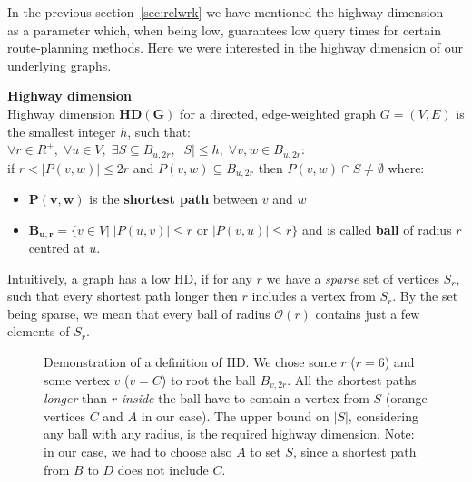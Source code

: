 \noindent In the previous section~\ref{sec:relwrk} we have mentioned the highway dimension~\cite{highwaydim10} as a parameter which, when being low, guarantees low query times for certain route-planning methods. Here we were interested in the highway dimension of our underlying graphs.
	
	\begin{definition}
		\textbf{Highway dimension} \\
		Highway dimension $\bm{HD(G)}$ for a directed, edge-weighted graph $G = (V, E)$ is the smallest integer $h$, such that:
        \vskip 10pt
        \indent $\forall r \in R^{+}, \; \forall u \in V, \; \exists S \subseteq B_{u, 2r}, \; |S| \leq h, \; \forall v, w \in B_{u, 2r}$: \\
        \indent \indent if $r < |P(v, w)| \leq 2r$ and $P(v, w) \subseteq B_{u, 2r}$ then $P(v, w) \cap S \neq \emptyset$
        \vskip 10pt
		\noindent where:
		\begin{itemize}
			\item $\bm{P(v, w)}$ is the \textbf{shortest path} between $v$ and $w$
			\item $\bm{B_{u, r}} = \{v \in V | \; |P(u, v)| \leq r$ or $|P(v, u)| \leq r\}$ and is called \textbf{ball} of radius $r$ centred at $u$.
		\end{itemize}
	\end{definition}

	\noindent Intuitively, a graph has a low HD, if for any $r$ we have a \emph{sparse} set of vertices $S_{r}$, such that every shortest path longer then $r$ includes a vertex from $S_{r}$. By the set being sparse, we mean that every ball of radius $\mathcal{O}(r)$ contains just a few elements of $S_{r}$.

	\begin{figure}[h!]
    	\begin{center}
		\end{center}
        \caption{\label{fig:highdemonstr} Demonstration of a definition of HD. We chose some $r$ ($r = 6$) and some vertex $v$ ($v = C$) to root the ball $B_{v, 2r}$. All the shortest paths \emph{longer} than $r$ \emph{inside} the ball have to contain a vertex from $S$ (orange vertices $C$ and $A$ in our case). The upper bound on $|S|$, considering any ball with any radius, is the required highway dimension. Note: in our case, we had to choose also $A$ to set $S$, since a shortest path from $B$ to $D$ does not include $C$.}
	\end{figure}
	
